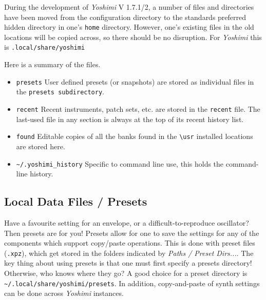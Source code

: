    During the development of \textsl{Yoshimi} V 1.7.1/2, a number of files and
   directories have been moved from the configuration directory to the
   standards preferred hidden directory in one's \texttt{home} directory.
   However, one's existing files in the old locations will be copied across, so
   there should be no disruption. For \textsl{Yoshimi} this is
   \texttt{.local/share/yoshimi}

   Here is a summary of the files.

\begin{itemize}
    \item \texttt{presets}
        User defined presets (or snapshots) are stored as individual files in
        the \texttt{presets subdirectory}.
   \item \texttt{recent}
         Recent instruments, patch sets, etc. are stored in the \texttt{recent}
         file. The last-used file in any section is always at the top of its
         recent history list.
    \item \texttt{found}
        Editable copies of all the banks found in the \texttt{\textbackslash usr}
        installed locations are stored here.
    \item \texttt{\textasciitilde/.yoshimi\_history}
         Specific to command line use, this holds the command-line history.
\end{itemize}

\subsection{Local Data Files / Presets}
\label{subsec:local_data_preset}

   Have a favourite setting for an envelope, or a difficult-to-reproduce
   oscillator? Then presets are for you! Presets allow for one to save the
   settings for any of the components which support copy/paste operations.
   This is done with preset files (\texttt{.xpz}), which get stored in the
   folders indicated by \textsl{Paths / Preset Dirs...}.
   The key thing about using presets is that one must first
   specify a presets directory!  Otherwise, who knows where they go?
   A good choice for a preset directory is
   \texttt{\textasciitilde/.local/share/yoshimi/presets}.
   In addition, copy-and-paste of synth settings can be done across
   \textsl{Yoshimi} instances.

